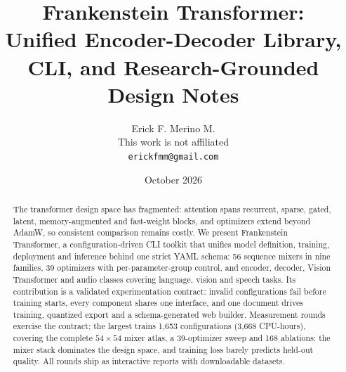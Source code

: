 \documentclass[11pt,a4paper]{article}
\title{Frankenstein Transformer:\\Unified Encoder-Decoder Library, CLI, and Research-Grounded Design Notes}
\author{
Erick F. Merino M. \\
This work is not affiliated \\
\texttt{erickfmm@gmail.com}
}
\date{October 2026}
\renewcommand{\_}{\fsunderscore\allowbreak}
\begin{document}
\maketitle

\begin{abstract}
The transformer design space has fragmented: attention spans recurrent, sparse, gated, latent, memory-augmented and fast-weight blocks, and optimizers extend beyond AdamW, so consistent comparison remains costly. We present Frankenstein Transformer, a configuration-driven CLI toolkit that unifies model definition, training, deployment and inference behind one strict YAML schema: 56 sequence mixers in nine families, 39 optimizers with per-parameter-group control, and encoder, decoder, Vision Transformer and audio classes covering language, vision and speech tasks. Its contribution is a validated experimentation contract: invalid configurations fail before training starts, every component shares one interface, and one document drives training, quantized export and a schema-generated web builder. Measurement rounds exercise the contract; the largest trains 1,653 configurations (3,668 CPU-hours), covering the complete $54\times54$ mixer atlas, a 39-optimizer sweep and 168 ablations: the mixer stack dominates the design space, and training loss barely predicts held-out quality. All rounds ship as interactive reports with downloadable datasets.
\end{abstract}

\tableofcontents
\newpage
















\appendix
\renewcommand{\thesection}{\arabic{section}}
\setcounter{section}{0}
\end{document}
